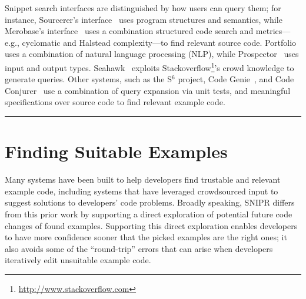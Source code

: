 
Snippet search interfaces are distinguished by how users can query them; for instance, Sourcerer's interface~\cite{Bajracharya:2006vn, Bajracharya:2010um} uses program structures and semantics, while 
Merobase's interface~\cite{Hummel:eq} uses a combination structured code search and metrics---e.g., cyclomatic and Halstead complexity---to find relevant source code. Portfolio\cite{McMillan:2011cm, McMillan:2011wq} uses a combination of natural language processing (NLP), while Prospector~\cite{Mandelin:2005uj} uses input and output types. Seahawk~\cite{Bacchelli:2012dl} exploits Stackoverflow\footnote{\url{http://www.stackoverflow.com}}'s crowd knowledge to generate queries. Other systems, such as the S$^{6}$ project\cite{Reiss:2009fu}, Code Genie~\cite{LazzariniLemos:2007jh}, and Code Conjurer~\cite{Hummel:eq} use a combination of query expansion via unit tests, and meaningful specifications over source code to find relevant example code.
 
\fancybreak{\pfbreakdisplay}

\section{Finding Suitable Examples}
\label{sec:codesearch}

Many systems have been built to help developers find trustable and relevant example code, including systems that have leveraged crowdsourced input to suggest solutions to developers' code problems. Broadly speaking, \uppercase{SnipR} differs from this prior work by supporting a direct exploration of potential future code changes of found examples. Supporting this direct exploration enables developers to have more confidence sooner that the picked examples are the right ones; it also avoids some of the ``round-trip'' errors that can arise when developers iteratively edit unsuitable example code.

